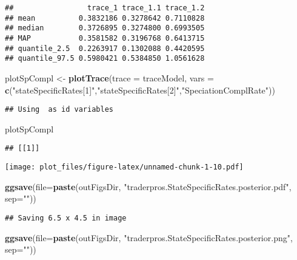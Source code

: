 \documentclass[
]{article}
\newenvironment{Shaded}{\begin{snugshade}}{\end{snugshade}}
\newcommand{\AttributeTok}[1]{\textcolor[rgb]{0.13,0.29,0.53}{#1}}
\newcommand{\FunctionTok}[1]{\textcolor[rgb]{0.13,0.29,0.53}{\textbf{#1}}}
\newcommand{\NormalTok}[1]{#1}
\newcommand{\OtherTok}[1]{\textcolor[rgb]{0.56,0.35,0.01}{#1}}
\newcommand{\StringTok}[1]{\textcolor[rgb]{0.31,0.60,0.02}{#1}}
\begin{document}
\begin{verbatim}
##                 trace_1 trace_1.1 trace_1.2
## mean          0.3832186 0.3278642 0.7110828
## median        0.3726895 0.3274800 0.6993505
## MAP           0.3581582 0.3196768 0.6413715
## quantile_2.5  0.2263917 0.1302088 0.4420595
## quantile_97.5 0.5980421 0.5384850 1.0561628
\end{verbatim}

\begin{Shaded}
\begin{Highlighting}[]
\NormalTok{plotSpCompl }\OtherTok{\textless{}{-}} \FunctionTok{plotTrace}\NormalTok{(}\AttributeTok{trace =}\NormalTok{ traceModel, }
                       \AttributeTok{vars =} \FunctionTok{c}\NormalTok{(}\StringTok{"stateSpecificRates[1]"}\NormalTok{,}\StringTok{"stateSpecificRates[2]"}\NormalTok{,}\StringTok{"SpeciationComplRate"}\NormalTok{)) }
\end{Highlighting}
\end{Shaded}

\begin{verbatim}
## Using  as id variables
\end{verbatim}

\begin{Shaded}
\begin{Highlighting}[]
\NormalTok{plotSpCompl}
\end{Highlighting}
\end{Shaded}

\begin{verbatim}
## [[1]]
\end{verbatim}

\texttt{[image: plot\_files/figure-latex/unnamed-chunk-1-10.pdf]}

\begin{Shaded}
\begin{Highlighting}[]
\FunctionTok{ggsave}\NormalTok{(}\AttributeTok{file=}\FunctionTok{paste}\NormalTok{(outFigsDir, }\StringTok{"traderpros.StateSpecificRates.posterior.pdf"}\NormalTok{, }\AttributeTok{sep=}\StringTok{""}\NormalTok{)) }
\end{Highlighting}
\end{Shaded}

\begin{verbatim}
## Saving 6.5 x 4.5 in image
\end{verbatim}

\begin{Shaded}
\begin{Highlighting}[]
\FunctionTok{ggsave}\NormalTok{(}\AttributeTok{file=}\FunctionTok{paste}\NormalTok{(outFigsDir, }\StringTok{"traderpros.StateSpecificRates.posterior.png"}\NormalTok{, }\AttributeTok{sep=}\StringTok{""}\NormalTok{))}
\end{Highlighting}
\end{Shaded}
\end{document}
